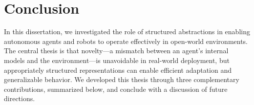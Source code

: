 \chapter{Conclusion}
\label{ch:conclusion}

In this dissertation, we investigated the role of structured abstractions in enabling autonomous agents and robots to operate effectively in open-world environments. The central thesis is that novelty---a mismatch between an agent's internal models and the environment---is unavoidable in real-world deployment, but appropriately structured representations can enable efficient adaptation and generalizable behavior. We developed this thesis through three complementary contributions, summarized below, and conclude with a discussion of future directions.








